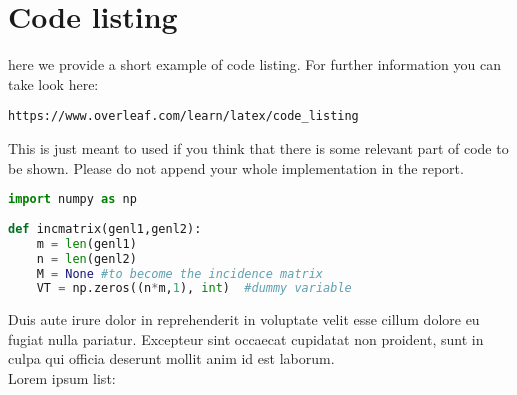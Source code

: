 \documentclass[a4paper,11pt]{report}
\begin{document}
\section{Code listing}

here we provide a short example of code listing. For further information you can take look here:

\texttt{https://www.overleaf.com/learn/latex/code\_listing}

This is just meant to used if you think that there is some relevant part of code to be shown. Please do not append your whole implementation in the report.
\begin{lstlisting}[language=Python]
import numpy as np
    
def incmatrix(genl1,genl2):
    m = len(genl1)
    n = len(genl2)
    M = None #to become the incidence matrix
    VT = np.zeros((n*m,1), int)  #dummy variable

\end{lstlisting}

\newpage

Duis aute irure dolor in reprehenderit in voluptate velit esse cillum dolore eu fugiat nulla pariatur. Excepteur sint occaecat cupidatat non proident, sunt in culpa qui officia deserunt mollit anim id est laborum. \\ Lorem ipsum list:






\end{document}
